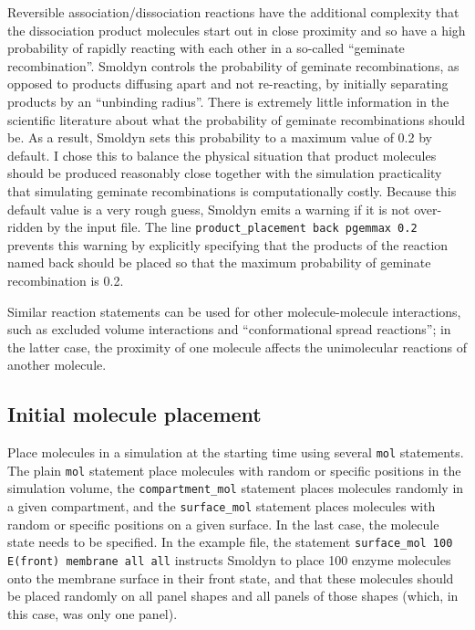 \documentclass {book}
\newcommand {\ttt} {\texttt}
\begin{document}
Reversible association/dissociation reactions have the additional complexity that the dissociation product molecules start out in close proximity and so have a high probability of rapidly reacting with each other in a so-called ``geminate recombination''. Smoldyn controls the probability of geminate recombinations, as opposed to products diffusing apart and not re-reacting, by initially separating products by an ``unbinding radius''. There is extremely little information in the scientific literature about what the probability of geminate recombinations should be. As a result, Smoldyn sets this probability to a maximum value of 0.2 by default. I chose this to balance the physical situation that product molecules should be produced reasonably close together with the simulation practicality that simulating geminate recombinations is computationally costly. Because this default value is a very rough guess, Smoldyn emits a warning if it is not over-ridden by the input file. The line  \ttt{product\_placement back pgemmax 0.2} prevents this warning by explicitly specifying that the products of the reaction named back should be placed so that the maximum probability of geminate recombination is 0.2.

Similar reaction statements can be used for other molecule-molecule interactions, such as excluded volume interactions and ``conformational spread reactions''; in the latter case, the proximity of one molecule affects the unimolecular reactions of another molecule.

\subsection*{Initial molecule placement}

Place molecules in a simulation at the starting time using several  \ttt{mol} statements. The plain  \ttt{mol} statement place molecules with random or specific positions in the simulation volume, the  \ttt{compartment\_mol} statement places molecules randomly in a given compartment, and the  \ttt{surface\_mol} statement places molecules with random or specific positions on a given surface. In the last case, the molecule state needs to be specified. In the example file, the statement  \ttt{surface\_mol 100 E(front) membrane all all} instructs Smoldyn to place 100 enzyme molecules onto the membrane surface in their front state, and that these molecules should be placed randomly on all panel shapes and all panels of those shapes (which, in this case, was only one panel).
\end{document}
